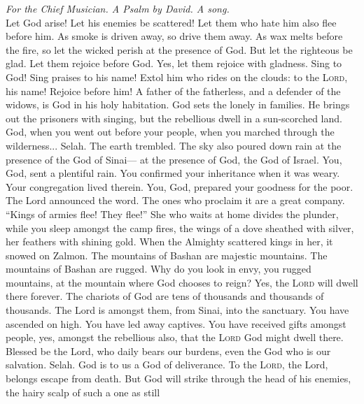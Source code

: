 \emph{For the Chief Musician. A Psalm by David. A song.}\\
 Let God arise! Let his enemies be scattered! Let them who
hate him also flee before him.  As smoke is driven away,
so drive them away. As wax melts before the fire, so let the wicked
perish at the presence of God.  But let the righteous be
glad. Let them rejoice before God. Yes, let them rejoice with gladness.
 Sing to God! Sing praises to his name! Extol him who
rides on the clouds: to the \textsc{Lord}, his name! Rejoice before him!
 A father of the fatherless, and a defender of the widows,
is God in his holy habitation.  God sets the lonely in
families. He brings out the prisoners with singing, but the rebellious
dwell in a sun-scorched land.  God, when you went out
before your people, when you marched through the wilderness... Selah.
 The earth trembled. The sky also poured down rain at the
presence of the God of Sinai--- at the presence of God, the God of
Israel.  You, God, sent a plentiful rain. You confirmed
your inheritance when it was weary.  Your congregation
lived therein. You, God, prepared your goodness for the poor.
 The Lord announced the word. The ones who proclaim it
are a great company.  ``Kings of armies flee! They
flee!'' She who waits at home divides the plunder,  while
you sleep amongst the camp fires, the wings of a dove sheathed with
silver, her feathers with shining gold.  When the
Almighty scattered kings in her, it snowed on Zalmon. 
The mountains of Bashan are majestic mountains. The mountains of Bashan
are rugged.  Why do you look in envy, you rugged
mountains, at the mountain where God chooses to reign? Yes, the
\textsc{Lord} will dwell there forever.  The chariots of
God are tens of thousands and thousands of thousands. The Lord is
amongst them, from Sinai, into the sanctuary.  You have
ascended on high. You have led away captives. You have received gifts
amongst people, yes, amongst the rebellious also, that the \textsc{Lord}
God might dwell there.  Blessed be the Lord, who daily
bears our burdens, even the God who is our salvation. Selah.
 God is to us a God of deliverance. To the \textsc{Lord},
the Lord, belongs escape from death.  But God will strike
through the head of his enemies, the hairy scalp of such a one as still
